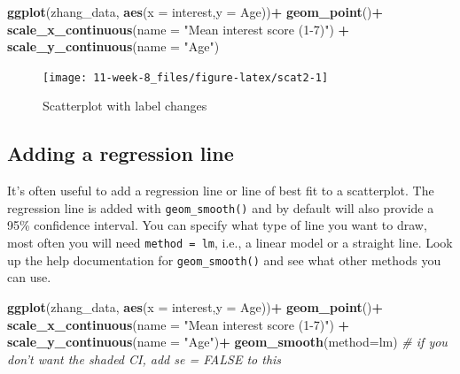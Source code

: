\documentclass[]{book}
\newenvironment{Shaded}{\begin{snugshade}}{\end{snugshade}}
\newcommand{\CommentTok}[1]{\textcolor[rgb]{0.56,0.35,0.01}{\textit{#1}}}
\newcommand{\DataTypeTok}[1]{\textcolor[rgb]{0.13,0.29,0.53}{#1}}
\newcommand{\KeywordTok}[1]{\textcolor[rgb]{0.13,0.29,0.53}{\textbf{#1}}}
\newcommand{\NormalTok}[1]{#1}
\newcommand{\OperatorTok}[1]{\textcolor[rgb]{0.81,0.36,0.00}{\textbf{#1}}}
\newcommand{\StringTok}[1]{\textcolor[rgb]{0.31,0.60,0.02}{#1}}
\begin{document}
\begin{Shaded}
\begin{Highlighting}[]
\KeywordTok{ggplot}\NormalTok{(zhang_data, }\KeywordTok{aes}\NormalTok{(}\DataTypeTok{x =}\NormalTok{ interest,}\DataTypeTok{y =}\NormalTok{ Age))}\OperatorTok{+}
\StringTok{       }\KeywordTok{geom_point}\NormalTok{()}\OperatorTok{+}
\StringTok{  }\KeywordTok{scale_x_continuous}\NormalTok{(}\DataTypeTok{name =} \StringTok{"Mean interest score (1-7)"}\NormalTok{) }\OperatorTok{+}\StringTok{ }
\StringTok{  }\KeywordTok{scale_y_continuous}\NormalTok{(}\DataTypeTok{name =} \StringTok{"Age"}\NormalTok{)}
\end{Highlighting}
\end{Shaded}

\begin{figure}

{\centering \texttt{[image: 11-week-8\_files/figure-latex/scat2-1]} 

}

\caption{Scatterplot with label changes}\label{fig:scat2}
\end{figure}

\hypertarget{adding-a-regression-line}{%
\subsection{Adding a regression line}\label{adding-a-regression-line}}

It's often useful to add a regression line or line of best fit to a scatterplot. The regression line is added with \texttt{geom\_smooth()} and by default will also provide a 95\% confidence interval. You can specify what type of line you want to draw, most often you will need \texttt{method\ =\ lm}, i.e., a linear model or a straight line. Look up the help documentation for \texttt{geom\_smooth()} and see what other methods you can use.

\begin{Shaded}
\begin{Highlighting}[]
\KeywordTok{ggplot}\NormalTok{(zhang_data, }\KeywordTok{aes}\NormalTok{(}\DataTypeTok{x =}\NormalTok{ interest,}\DataTypeTok{y =}\NormalTok{ Age))}\OperatorTok{+}
\StringTok{  }\KeywordTok{geom_point}\NormalTok{()}\OperatorTok{+}
\StringTok{  }\KeywordTok{scale_x_continuous}\NormalTok{(}\DataTypeTok{name =} \StringTok{"Mean interest score (1-7)"}\NormalTok{) }\OperatorTok{+}\StringTok{ }
\StringTok{  }\KeywordTok{scale_y_continuous}\NormalTok{(}\DataTypeTok{name =} \StringTok{"Age"}\NormalTok{)}\OperatorTok{+}
\StringTok{  }\KeywordTok{geom_smooth}\NormalTok{(}\DataTypeTok{method=}\NormalTok{lm) }\CommentTok{# if you don't want the shaded CI, add se = FALSE to this}
\end{Highlighting}
\end{Shaded}
\end{document}
